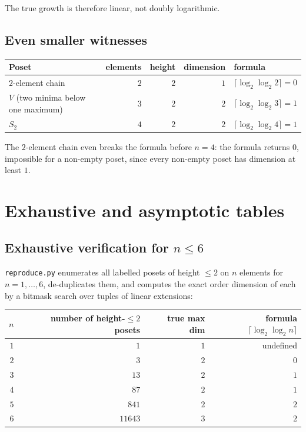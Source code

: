\documentclass[11pt]{article}
\theoremstyle{definition}
\theoremstyle{remark}
\begin{document}
The true growth is therefore linear, not doubly logarithmic.

\subsection{Even smaller witnesses}

\begin{center}
\begin{tabular}{l r r r l}
\toprule
Poset & elements & height & dimension & formula \\
\midrule
$2$-element chain & $2$ & $2$ & $1$ & $\lceil \log_2\log_2 2\rceil = 0$ \\
$V$ (two minima below one maximum) & $3$ & $2$ & $2$ & $\lceil \log_2\log_2 3\rceil = 1$ \\
$S_2$ & $4$ & $2$ & $2$ & $\lceil \log_2\log_2 4\rceil = 1$ \\
\bottomrule
\end{tabular}
\end{center}

The $2$-element chain even breaks the formula before $n=4$: the formula returns
$0$, impossible for a non-empty poset, since every non-empty poset has dimension
at least $1$.

\section{Exhaustive and asymptotic tables}

\subsection{Exhaustive verification for \texorpdfstring{$n \le 6$}{n <= 6}}

\texttt{reproduce.py} enumerates all labelled posets of height $\le 2$ on $n$
elements for $n=1,\dots,6$, de-duplicates them, and computes the exact order
dimension of each by a bitmask search over tuples of linear extensions:

\begin{center}
\begin{tabular}{r r r r}
\toprule
$n$ & number of height-$\le 2$ posets & true max dim & formula $\lceil\log_2\log_2 n\rceil$ \\
\midrule
$1$ & $1$    & $1$ & undefined \\
$2$ & $3$    & $2$ & $0$ \\
$3$ & $13$   & $2$ & $1$ \\
$4$ & $87$   & $2$ & $1$ \\
$5$ & $841$  & $2$ & $2$ \\
$6$ & $11643$& $3$ & $2$ \\
\bottomrule
\end{tabular}
\end{center}
\end{document}
